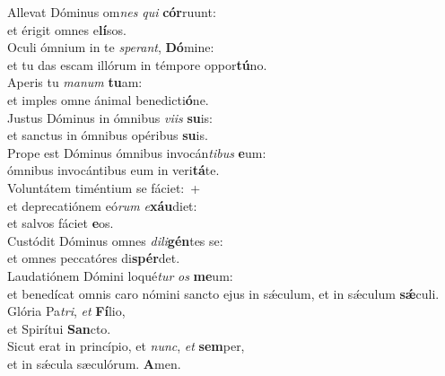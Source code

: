 \evenverse Allevat Dóminus om\textit{nes} \textit{qui} \textbf{cór}ruunt:~\*\\
\evenverse et érigit omnes e\textbf{lí}sos.\\
\oddverse Oculi ómnium in te \textit{spe}\textit{rant}, \textbf{Dó}mine:~\*\\
\oddverse et tu das escam illórum in témpore oppor\textbf{tú}no.\\
\evenverse Aperis tu \textit{ma}\textit{num} \textbf{tu}am:~\*\\
\evenverse et imples omne ánimal benedicti\textbf{ó}ne.\\
\oddverse Justus Dóminus in ómnibus \textit{vi}\textit{is} \textbf{su}is:~\*\\
\oddverse et sanctus in ómnibus opéribus \textbf{su}is.\\
\evenverse Prope est Dóminus ómnibus invocán\textit{ti}\textit{bus} \textbf{e}um:~\*\\
\evenverse ómnibus invocántibus eum in veri\textbf{tá}te.\\
\oddverse Voluntátem timéntium se fáciet:~+\\
\oddverse  et deprecatiónem eó\textit{rum} \textit{e}\textbf{xáu}diet:~\*\\
\oddverse et salvos fáciet \textbf{e}os.\\
\evenverse Custódit Dóminus omnes \textit{di}\textit{li}\textbf{gén}tes se:~\*\\
\evenverse et omnes peccatóres di\textbf{spér}det.\\
\oddverse Laudatiónem Dómini loqué\textit{tur} \textit{os} \textbf{me}um:~\*\\
\oddverse et benedícat omnis caro nómini sancto ejus in sǽculum, et in sǽculum \textbf{sǽ}culi.\\
\evenverse Glória Pa\textit{tri}, \textit{et} \textbf{Fí}lio,~\*\\
\evenverse et Spirítui \textbf{San}cto.\\
\oddverse Sicut erat in princípio, et \textit{nunc}, \textit{et} \textbf{sem}per,~\*\\
\oddverse et in sǽcula sæculórum. \textbf{A}men.\\
